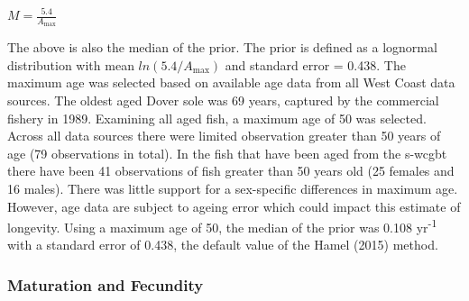 \documentclass[11pt,
  english,
  a4paper,
]{article}
\begin{document}
\leavevmode\tagmcend\tagstructend\par

\begin{centering}

$M=\frac{5.4}{A_{\text{max}}}$

\end{centering}

\vspace{0.5cm}


The above is also the median of the prior. The prior is defined as a lognormal distribution with mean {\(ln(5.4/A_{\text{max}})\)\leavevmode\tagmcend\tagstructend} and standard error = 0.438. The maximum age was selected based on available age data from all West Coast data sources. The oldest aged Dover sole was 69 years, captured by the commercial fishery in 1989. Examining all aged fish, a maximum age of 50 was selected. Across all data sources there were limited observation greater than 50 years of age (79 observations in total). In the fish that have been aged from the \Gls{s-wcgbt} there have been 41 observations of fish greater than 50 years old (25 females and 16 males). There was little support for a sex-specific differences in maximum age. However, age data are subject to ageing error which could impact this estimate of longevity. Using a maximum age of 50, the median of the prior was 0.108 yr\textsuperscript{-1} with a standard error of 0.438, the default value of the Hamel {(2015)\leavevmode\tagmcend\tagstructend} method.

\leavevmode\tagmcend\tagstructend\par


\hypertarget{maturation-and-fecundity}{%
\subsubsection{Maturation and Fecundity}\label{maturation-and-fecundity}}

\leavevmode\tagmcend\tagstructend

\end{document}
